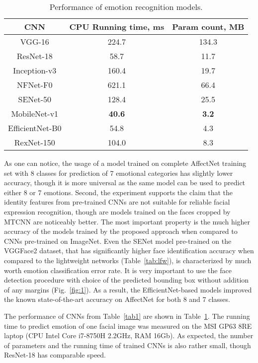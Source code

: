 \documentclass[runningheads]{llncs}
\begin{document}
\begin{table}[t]
\caption{Performance of emotion recognition models.}\label{tab2}
\centering
\begin{tabular}{|c|c|c|}
\hline
CNN & CPU Running time, ms & Param count, MB\\
\hline
VGG-16 & 224.7 & 134.3\\ ResNet-18 & 58.7 & 11.7\\ Inception-v3 & 160.4 & 19.7\\ NFNet-F0 & 621.1 & 66.4\\ SENet-50 & 128.4 & 25.5\\ \hline
MobileNet-v1 & \bf 40.6 & \bf 3.2\\EfficientNet-B0 & 54.8 & 4.3\\ RexNet-150 & 104.0 & 8.3\\
\hline
\end{tabular}
\end{table}

As one can notice, the usage of a model trained on complete AffectNet training set with 8 classes for prediction of 7 emotional categories has slightly lower accuracy, though it is more universal as the same model can be used to predict either 8 or 7 emotions. Second, the experiment supports the claim that the identity features from pre-trained CNNs are not suitable for reliable facial expression recognition, though are models trained on the faces cropped by MTCNN are noticeably better. The most important property is the much higher accuracy of the models trained by the proposed approach when compared to CNNs pre-trained on ImageNet. Even the SENet model pre-trained on the VGGFace2 dataset, that has significantly higher face identification accuracy when compared to the lightweight networks (Table~\ref{tab:lfw}), is characterized by much worth emotion classification error rate. It is very important to use the face detection procedure with choice of the predicted bounding box without addition of any margins (Fig.~\ref{fig:1}). As a result, the EfficientNet-based models improved the known state-of-the-art accuracy on AffectNet for both 8 and 7 classes. 

The performance of CNNs from Table~\ref{tab1} are shown in Table~\ref{tab2}. The running time to predict emotion of one facial image was measured on the MSI GP63 8RE laptop (CPU Intel Core i7-8750H 2.2GHz, RAM 16Gb). As expected, the number of parameters and the running time of trained CNNs is also rather small, though ResNet-18 has comparable speed. 
\end{document}
